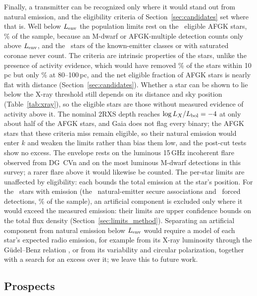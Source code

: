 \documentclass[linenumbers]{aastex702}
\begin{document}
Finally, a transmitter can be recognized only where it would stand out from natural emission, and the eligibility criteria of Section~\ref{sec:candidates} set where that is. Well below $L_{\rm env}$ the population limits rest on the \NElig\ eligible AFGK stars, \PctElig\% of the sample, because an M-dwarf or AFGK-multiple detection counts only above $L_{\rm env}$, and the \NExclAll\ stars of the known-emitter classes or with saturated coronae never count. The criteria are intrinsic properties of the stars, unlike the presence of activity evidence, which would have removed \PctActTen\% of the stars within 10\,pc but only \PctActHundred\% at 80--100\,pc, and the net eligible fraction of AFGK stars is nearly flat with distance (Section~\ref{sec:candidates}). Whether a star can be shown to lie below the X-ray threshold still depends on its distance and sky position (Table~\ref{tab:xray}), so the eligible stars are those without measured evidence of activity above it. The nominal 2RXS depth reaches $\log L_X/L_{\rm bol}=-4$ at only about half of the AFGK stars, and Gaia does not flag every binary; the AFGK stars that these criteria miss remain eligible, so their natural emission would enter $k$ and weaken the limits rather than bias them low, and the post-cut tests show no excess. The envelope rests on the luminous 15\,GHz incoherent flare observed from DG~CVn and on the most luminous M-dwarf detections in this survey; a rarer flare above it would likewise be counted. The per-star limits are unaffected by eligibility: each bounds the total emission at the star's position. For the \NEmitters\ stars with emission (the \NNatural\ natural-emitter secure associations and \NCandStars\ forced detections, \NEmitPct\% of the sample), an artificial component is excluded only where it would exceed the measured emission: their limits are upper confidence bounds on the total flux density (Section~\ref{sec:limits_method}). Separating an artificial component from natural emission below $L_{\rm env}$ would require a model of each star's expected radio emission, for example from its X-ray luminosity through the G\"udel--Benz relation \citep{GudelBenz1993}, or from its variability and circular polarization, together with a search for an excess over it; we leave this to future work.

\subsection{Prospects} \label{sec:prospects}
\end{document}

